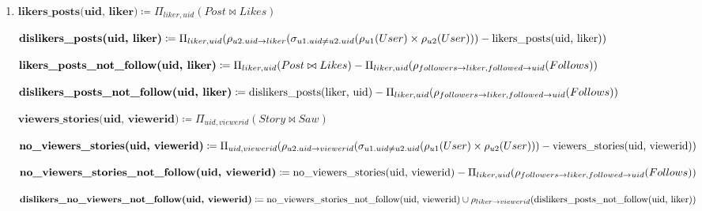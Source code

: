 \documentclass[12pt]{article}
\begin{document}
\begin{enumerate}[1.]
    \item

    \bigskip

    $\textbf{likers\_posts(uid, liker)} \coloneqq \Pi_{liker, uid}(Post \bowtie Likes)$

    \bigskip

    $\textbf{dislikers\_posts(uid, liker)} \coloneqq \Pi_{liker, uid}(\rho_{u2.uid \to liker}(\sigma_{u1.uid \neq u2.uid}(\\\rho_{u1}(User) \times \rho_{u2}(User))) - \text{likers\_posts(uid, liker)})$

    \bigskip

    $\textbf{likers\_posts\_not\_follow(uid, liker)} \coloneqq \Pi_{liker, uid}(Post \bowtie Likes) -\\ \Pi_{liker, uid}(\rho_{followers \to liker, followed \to uid}(Follows))$

    \bigskip

    $\textbf{dislikers\_posts\_not\_follow(uid, liker)} \coloneqq \text{dislikers\_posts(liker, uid)} -\\ \Pi_{liker, uid}(\rho_{followers \to liker, followed \to uid}(Follows))$

    \bigskip

    $\textbf{viewers\_stories(uid, viewerid)} \coloneqq \Pi_{uid, viewerid}(Story \bowtie Saw)$

    \bigskip

    $\textbf{no\_viewers\_stories(uid, viewerid)} \coloneqq \Pi_{uid, viewerid}(\rho_{u2.uid \to viewerid}(\sigma_{u1.uid \neq u2.uid}(\\\rho_{u1}(User) \times \rho_{u2}(User))) - \text{viewers\_stories(uid, viewerid)})$

    \bigskip

    $\textbf{no\_viewers\_stories\_not\_follow(uid, viewerid)} \coloneqq \\\text{no\_viewers\_stories(uid, viewerid)} - \Pi_{liker, uid}(\rho_{followers \to liker, followed \to uid}(Follows))$

    \bigskip

    $\textbf{dislikers\_no\_viewers\_not\_follow(uid, viewerid)} \coloneqq \\ \text{no\_viewers\_stories\_not\_follow(uid, viewerid)} \cup \\ \rho_{liker \to viewerid}(\text{dislikers\_posts\_not\_follow(uid, liker)})$

    \bigskip


\end{enumerate}
\end{document}
